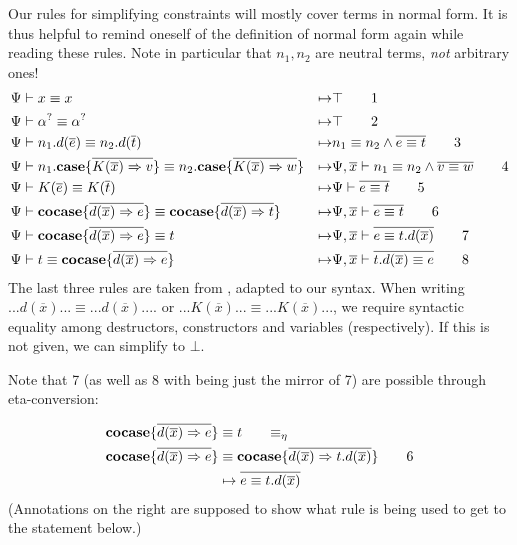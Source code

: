 \documentclass[twoside,12pt,a4paper]{article}
\begin{document}
Our rules for simplifying constraints will mostly cover terms in normal form. It is thus helpful to remind oneself of 
the definition of normal form again while reading these rules.
Note in particular that $n_1, n_2$ are neutral terms, \textit{not} arbitrary ones!
\begin{align*}
    &\Psi \vdash x\equiv x&\mapsto&\top
    \tag*{1}\\
    &\Psi \vdash \alpha^? \equiv \alpha^?&\mapsto& \top
    \tag*{2}\\
    &\Psi \vdash n_1.d({\overline{e}})\equiv n_2.d({\overline{t}})
    &\mapsto& n_1 \equiv n_2 \wedge \overline{e\equiv t}
    \tag*{3}\\
    &\Psi \vdash n_1.\textbf{case}\{\overline{K(\overline{x})\Rightarrow v}\}\equiv n_2.\textbf{case}\{\overline{K(\overline{x})\Rightarrow w}\}
    &\mapsto& \Psi, \overline{x} \vdash n_1 \equiv n_2\wedge \overline{v\equiv w}
    \tag*{4}\\
    &\Psi\vdash K(\overline{e})\equiv K(\overline{t})&\mapsto&\Psi\vdash\overline{e\equiv t}
    \tag*{5}\\
    &\Psi\vdash \textbf{cocase}\{\overline{d(\overline{x})\Rightarrow e}\}\equiv 
    \textbf{cocase}\{\overline{d(\overline{x})\Rightarrow t}\}
    &\mapsto& \Psi, \overline{x}\vdash \overline{e \equiv t}
    \tag*{6}\\
    &\Psi\vdash \textbf{cocase}\{\overline{d(\overline{x})\Rightarrow e}\}\equiv t 
    &\mapsto& \Psi,\overline{x} \vdash\overline{e \equiv t.d(\overline{x})}
    \tag*{7}\\
    &\Psi\vdash t\equiv \textbf{cocase}\{\overline{d(\overline{x})\Rightarrow e}\} 
    &\mapsto& \Psi, \overline{x}\vdash \overline{t.d(\overline{x}) \equiv e}
    \tag*{8}\\
\end{align*}
The last three rules are taken from \cite{10.5555/2021953.2021960}, adapted to our syntax. 
When writing $... d(\overline{x})...\equiv ... d(\overline{x})....$ or $...K(\overline{x})...\equiv... K(\overline{x})...$,
we require syntactic equality among destructors, constructors and variables (respectively). If this is not given, we can simplify to $\bot$.


Note that 7 (as well as 8 with being just the mirror of 7) are possible through eta-conversion:




\begin{align*}
    \excopatmatch{\overline{d(\overline{x})\Rightarrow e}}&\equiv t \tag*{$\equiv_{\eta}$}\\
    \excopatmatch{\overline{d(\overline{x})\Rightarrow e}}&\equiv \excopatmatch{\overline{d(\overline{x})\Rightarrow t.d(\overline{x})}} \tag*{6}\\
    &\mapsto \overline{e \equiv t.d(\overline{x})}
\end{align*}
(Annotations on the right are supposed to show what rule is being used to get to the statement below.)
\end{document}
